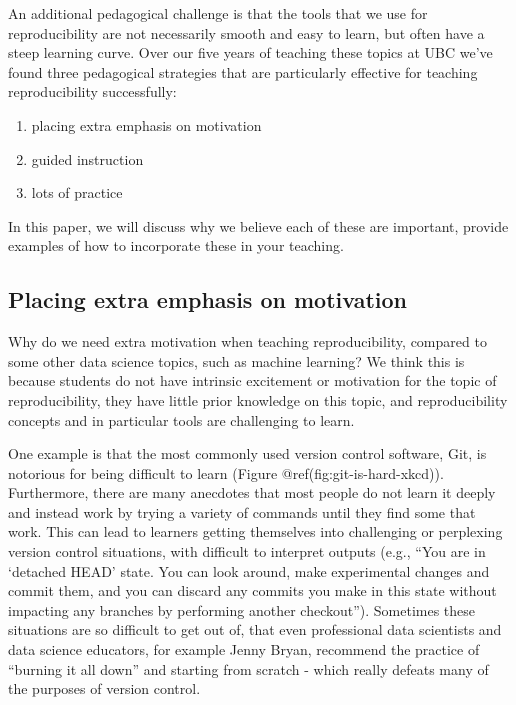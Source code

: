 \documentclass{article}
\begin{document}
An additional pedagogical challenge is that the tools that we use for
reproducibility are not necessarily smooth and easy to learn, but often
have a steep learning curve. Over our five years of teaching these
topics at UBC we've found three pedagogical strategies that are
particularly effective for teaching reproducibility successfully:

\begin{enumerate}
\def\labelenumi{\arabic{enumi}.}
\tightlist
\item
  placing extra emphasis on motivation
\item
  guided instruction
\item
  lots of practice
\end{enumerate}

In this paper, we will discuss why we believe each of these are
important, provide examples of how to incorporate these in your
teaching.

\hypertarget{placing-extra-emphasis-on-motivation}{%
\subsection{Placing extra emphasis on
motivation}\label{placing-extra-emphasis-on-motivation}}

Why do we need extra motivation when teaching reproducibility, compared
to some other data science topics, such as machine learning? We think
this is because students do not have intrinsic excitement or motivation
for the topic of reproducibility, they have little prior knowledge on
this topic, and reproducibility concepts and in particular tools are
challenging to learn.

One example is that the most commonly used version control software,
Git, is notorious for being difficult to learn (Figure
@ref(fig:git-is-hard-xkcd)). Furthermore, there are many anecdotes that
most people do not learn it deeply and instead work by trying a variety
of commands until they find some that work. This can lead to learners
getting themselves into challenging or perplexing version control
situations, with difficult to interpret outputs (e.g., ``You are in
`detached HEAD' state. You can look around, make experimental changes
and commit them, and you can discard any commits you make in this state
without impacting any branches by performing another checkout'').
Sometimes these situations are so difficult to get out of, that even
professional data scientists and data science educators, for example
Jenny Bryan, recommend the practice of ``burning it all down'' and
starting from scratch - which really defeats many of the purposes of
version control.
\end{document}
